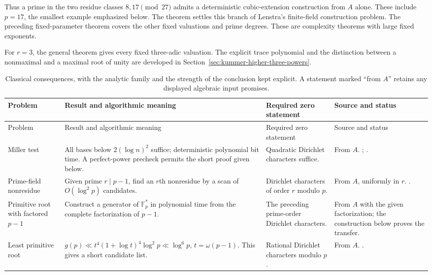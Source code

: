 \documentclass[11pt]{article}
\newcommand{\F}{\mathbb F}
\theoremstyle{definition}
\theoremstyle{remark}
\begin{document}
Thus a prime in the two residue classes \(8,17\pmod{27}\) admits a
deterministic cubic-extension construction from \(A\) alone. These
include \(p=17\), the smallest example emphasized below. The theorem
settles this branch of Lenstra's finite-field construction problem.
The preceding fixed-parameter theorem covers the other fixed
valuations and prime degrees. These are complexity theorems with
large fixed exponents.

For \(r=3\), the general theorem gives every fixed three-adic
valuation. The explicit trace polynomial and the distinction between
a nonmaximal and a maximal root of unity are developed in
Section~\ref{sec:kummer-higher-three-powers}.

\begingroup
\small
\setlength{\tabcolsep}{4pt}
\renewcommand{\arraystretch}{1.18}
\begin{longtable}{@{}p{}p{}p{}p{}@{}}
\caption{Classical consequences, with the analytic family and the strength of the conclusion kept explicit. A statement marked ``from $A$'' retains any displayed algebraic input promises.}\label{tab:classical}\\
\toprule
Problem & Result and algorithmic meaning & Required zero statement & Source and status \\
\midrule
\endfirsthead
\toprule
Problem & Result and algorithmic meaning & Required zero statement & Source and status \\
\midrule
\endhead
\bottomrule
\endfoot
Miller test & All bases below $2(\log n)^2$ suffice; deterministic polynomial bit time. A perfect-power precheck permits the short proof given below. & Quadratic Dirichlet characters suffice. & From $A$. \citet[Thm.~2.2, pp.~105--106]{Schoof2008}; \citet[Thm.~2, p.~301]{Miller1976}. \\
Prime-field nonresidue & Given prime $r\mid p-1$, find an $r$th nonresidue by a scan of $O(\log^2p)$ candidates. & Dirichlet characters of order $r$ modulo $p$. & From $A$, uniformly in $r$. \citet[pp.~1--2]{LLS2015}. \\
Primitive root with factored $p-1$ & Construct a generator of $\F_p^*$ in polynomial time from the complete factorization of $p-1$. & The preceding prime-order Dirichlet characters. & From $A$ with the given factorization; the construction below proves the transfer. \\
Least primitive root & $g(p)\ll t^4(1+\log t)^4\log^2p\ll\log^6p$, $t=\omega(p-1)$. This gives a short candidate list. & Rational Dirichlet characters modulo $p$. & From $A$. \citet[Thm.~3, author p.~4; Prop.~9, p.~10; proof p.~13]{Shoup1992}. \\

\end{longtable}
\end{document}
